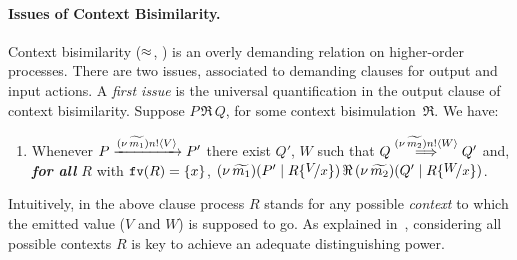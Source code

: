 

\paragraph{Issues of Context Bisimilarity.}
Context bisimilarity ($\approx$, ) is an overly demanding relation on higher-order processes. 
There are two issues, associated to demanding clauses for output and input actions. 
A \emph{first issue} %
is 
the universal quantification in the output clause of context bisimilarity.
Suppose $P \,\Re\, Q$, for some context bisimulation~$\Re$. We have:
\begin{enumerate}[$(\star)$]
	\item	Whenever 
		$P \xrightarrow{(\nu\, \widetilde{m_1}) n ! \langle V \rangle} P'$
		there exist
		$Q'$, $W$
		such that 
		$Q \stackrel{(\nu\, \widetilde{m_2}) n ! \langle W \rangle}{\Longrightarrow} Q'$
		and, \\ \emph{\textbf{for all} $R$}  with $\mathtt{fv}(R)=\{x\}$, 
		$\newsp{\widetilde{m_1}}{P' \Par R\subst{V}{x}} \,\Re\, \newsp{\widetilde{m_2}}{Q' \Par R\subst{W}{x}}$.
\end{enumerate}
Intuitively, 
in the above clause process $R$ stands for any possible \emph{context} to which the emitted value
($V$ and $W$) is supposed to go. 
As explained in~\cite{San96H}, considering 
all possible contexts $R$ is key to achieve an adequate distinguishing power.

